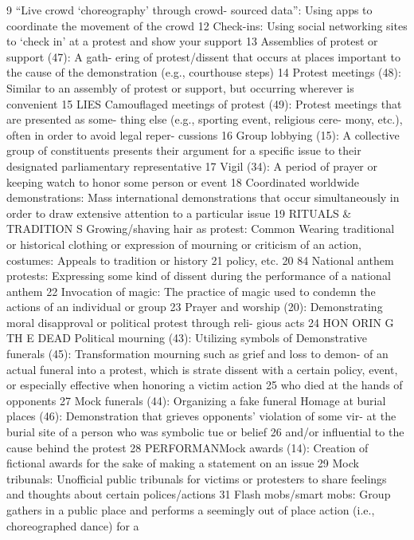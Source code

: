 \documentclass[twoside,a4paper,12pt,fleqn,openany]{extbook}
\begin{document}
9
“Live crowd ‘choreography’ through crowd-
sourced data”: Using apps to coordinate the
movement of the crowd
 12
Check-ins: Using social networking sites to
‘check in’ at a protest and show your support
13
Assemblies of protest or support (47): A gath-
ering of protest/dissent that occurs at places
important to the cause of the demonstration
(e.g., courthouse steps)
 14
Protest meetings (48): Similar to an assembly
of protest or support, but occurring wherever
is convenient
 15
LIES
Camouflaged meetings of protest (49):
Protest meetings that are presented as some-
thing else (e.g., sporting event, religious cere-
mony, etc.), often in order to avoid legal reper-
cussions
 16
Group lobbying (15): A collective group of
constituents presents their argument for a
specific issue to their designated parliamentary
representative
 17
Vigil (34): A period of prayer or keeping watch
to honor some person or event
 18
Coordinated worldwide demonstrations:
Mass international demonstrations that occur
simultaneously in order to draw extensive
attention to a particular issue
 19
RITUALS & TRADITION S
Growing/shaving hair as protest: Common
 Wearing traditional or historical clothing or
expression of mourning or criticism of an action,
 costumes: Appeals to tradition or history 21
policy, etc.
 20
84
National anthem protests: Expressing some
kind of dissent during the performance of a
national anthem
 22
Invocation of magic: The practice of magic
used to condemn the actions of an individual
or group
 23
Prayer and worship (20): Demonstrating moral
disapproval or political protest through reli-
gious acts
 24
HON ORIN G TH E DEAD
Political mourning (43): Utilizing symbols of
 Demonstrative funerals (45): Transformation
mourning such as grief and loss to demon-
 of an actual funeral into a protest, which is
strate dissent with a certain policy, event, or
 especially effective when honoring a victim
action
 25
 who died at the hands of opponents
 27
Mock funerals (44): Organizing a fake funeral
 Homage at burial places (46): Demonstration
that grieves opponents’ violation of some vir-
 at the burial site of a person who was symbolic
tue or belief
 26
 and/or influential to the cause behind the
protest
 28
PERFORMANMock awards (14): Creation of fictional awards
for the sake of making a statement on an
issue
 29
Mock tribunals: Unofficial public tribunals for
victims or protesters to share feelings and
thoughts about certain polices/actions
 31
Flash mobs/smart mobs: Group gathers in a
public place and performs a seemingly out of
place action (i.e., choreographed dance) for a
\end{document}
